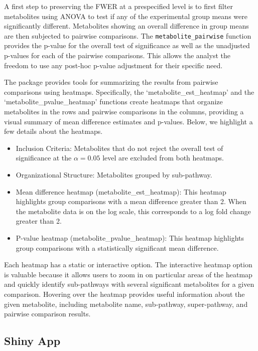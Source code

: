 A first step to preserving the FWER at a prespecified level is to first filter metabolites using ANOVA to test if any of the experimental group means were significantly different. Metabolites showing an overall difference in group means are then subjected to pairwise comparisons. The \texttt{metabolite\_pairwise} function provides the p-value for the overall test of significance as well as the unadjusted p-values for each of the pairwise comparisons. This allows the analyst the freedom to use any post-hoc p-value adjustment for their specific need.

The  package provides tools for summarizing the results from pairwise comparisons using heatmaps. Specifically, the `metabolite\_est\_heatmap' and the `metabolite\_pvalue\_heatmap' functions create heatmaps that organize metabolites in the rows and pairwise comparisons in the columns, providing a visual summary of mean difference estimates and p-values. Below, we highlight a few details about the heatmaps.

\begin{itemize}
\item
  Inclusion Criteria: Metabolites that do not reject the overall test of significance at the \(\alpha = 0.05\) level are excluded from both heatmaps.
\item
  Organizational Structure: Metabolites grouped by sub-pathway.
\item
  Mean difference heatmap (metabolite\_est\_heatmap): This heatmap highlights group comparisons with a mean difference greater than 2. When the metabolite data is on the log scale, this corresponds to a log fold change greater than 2.
\item
  P-value heatmap (metabolite\_pvalue\_heatmap): This heatmap highlights group comparisons with a statistically significant mean difference.
\end{itemize}

Each heatmap has a static or interactive option. The interactive heatmap option is valuable because it allows users to zoom in on particular areas of the heatmap and quickly identify sub-pathways with several significant metabolites for a given comparison. Hovering over the heatmap provides useful information about the given metabolite, including metabolite name, sub-pathway, super-pathway, and pairwise comparison results.

\subsection{Shiny App}\label{shiny-app}

